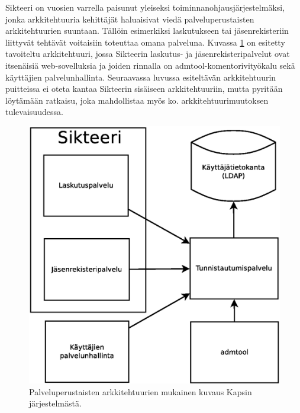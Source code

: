 Sikteeri on vuosien varrella paisunut yleiseksi toiminnanohjausjärjestelmäksi, jonka arkkitehtuuria kehittäjät haluaisivat viedä palveluperustaisten arkkitehtuurien suuntaan. Tällöin esimerkiksi laskutukseen tai jäsenrekisteriin liittyvät tehtävät voitaisiin toteuttaa omana palveluna. Kuvassa \ref{kapsi_uusi} on esitetty tavoiteltu arkkitehtuuri, jossa Sikteerin laskutus- ja jäsenrekisteripalvelut ovat itsenäisiä web-sovelluksia ja joiden rinnalla on admtool-komentorivityökalu sekä käyttäjien palvelunhallinta. Seuraavassa luvussa esiteltävän arkkitehtuurin puitteissa ei oteta kantaa Sikteerin sisäiseen arkkitehtuuriin, mutta pyritään löytämään ratkaisu, joka mahdollistaa myös ko. arkkitehtuurimuutoksen tulevaisuudessa.

\begin{figure}[ht]
\centering
\includegraphics[width=.7\textwidth]{toteutus/muutostarve/kapsi_uusi_soa.eps}
\caption{Palveluperustaisten arkkitehtuurien mukainen kuvaus Kapsin järjestelmästä.}%
\label{kapsi_uusi}
\end{figure}